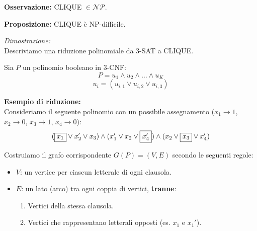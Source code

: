 \begin{center}
\end{center}

\textbf{Osservazione:} CLIQUE $\in \mathcal{NP}$.

\vspace{0.6cm}
\textbf{Proposizione:} CLIQUE è NP-difficile.

\vspace{0.2cm}
\textit{Dimostrazione:} \\
Descriviamo una riduzione polinomiale da 3-SAT a CLIQUE.

Sia $P$ un polinomio booleano in 3-CNF:
$$P = u_1 \land u_2 \land \dots \land u_K$$
$$u_i = (u_{i,1} \lor u_{i,2} \lor u_{i,3})$$

\textbf{Esempio di riduzione:} \\
Consideriamo il seguente polinomio con un possibile assegnamento ($x_1 \to 1$, $x_2 \to 0$, $x_3 \to 1$, $x_4 \to 0$):
$$ (\framebox{$x_1$} \lor x_2' \lor x_3) \land (x_1' \lor x_2 \lor \framebox{$x_4'$}) \land (x_2 \lor \framebox{$x_3$} \lor x_4') $$

Costruiamo il grafo corrispondente $G(P) = (V,E)$ secondo le seguenti regole:
\begin{itemize}
    \item $V$: un vertice per ciascun letterale di ogni clausola.
    \item $E$: un lato (arco) tra ogni coppia di vertici, \textbf{tranne}:
    \begin{enumerate}
        \item Vertici della stessa clausola.
        \item Vertici che rappresentano letterali opposti (es. $x_1$ e $x_1'$).
    \end{enumerate}
\end{itemize}

